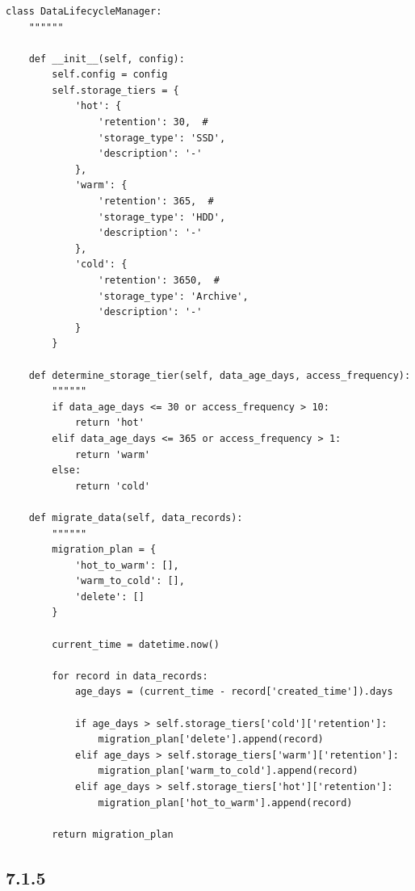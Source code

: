 \hypertarget{section-41}{%
\subsubsection{}\label{section-41}}

\begin{lstlisting}[style=python]
class DataLifecycleManager:
    """"""
    
    def __init__(self, config):
        self.config = config
        self.storage_tiers = {
            'hot': {
                'retention': 30,  # 
                'storage_type': 'SSD',
                'description': '-'
            },
            'warm': {
                'retention': 365,  #   
                'storage_type': 'HDD',
                'description': '-'
            },
            'cold': {
                'retention': 3650,  # 
                'storage_type': 'Archive',
                'description': '-'
            }
        }
    
    def determine_storage_tier(self, data_age_days, access_frequency):
        """"""
        if data_age_days <= 30 or access_frequency > 10:
            return 'hot'
        elif data_age_days <= 365 or access_frequency > 1:
            return 'warm'
        else:
            return 'cold'
    
    def migrate_data(self, data_records):
        """"""
        migration_plan = {
            'hot_to_warm': [],
            'warm_to_cold': [],
            'delete': []
        }
        
        current_time = datetime.now()
        
        for record in data_records:
            age_days = (current_time - record['created_time']).days
            
            if age_days > self.storage_tiers['cold']['retention']:
                migration_plan['delete'].append(record)
            elif age_days > self.storage_tiers['warm']['retention']:
                migration_plan['warm_to_cold'].append(record)
            elif age_days > self.storage_tiers['hot']['retention']:
                migration_plan['hot_to_warm'].append(record)
        
        return migration_plan
\end{lstlisting}

\hypertarget{section-42}{%
\subsection{7.1.5}\label{section-42}}

